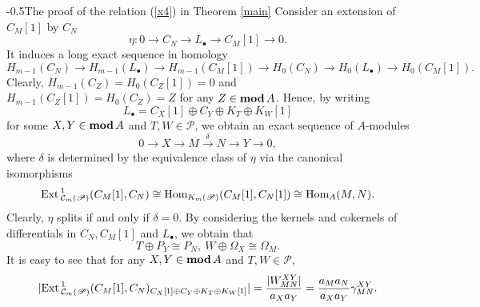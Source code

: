 \documentclass[reqno,12pt]{amsart}
\numberwithin{equation}{section}
\theoremstyle{plain}
\theoremstyle{definition}
\begin{document}
{
  {-\baselineskip}{0.5\baselineskip}{\bf\leftline}}{The proof of the relation (\ref{x4}) in Theorem \ref{main}}
Consider an extension of $C_M[1]$ by $C_N$
$$\eta: 0{\longrightarrow} C_N{\longrightarrow} L_{\bullet}{\longrightarrow} C_M[1] {\longrightarrow} 0.$$
It induces a long exact sequence in homology
$$H_{m-1}(C_N){\longrightarrow} H_{m-1}(L_{\bullet}){\longrightarrow} H_{m-1}(C_M[1]){\longrightarrow} H_0(C_N){\longrightarrow} H_0(L_{\bullet}){\longrightarrow} H_0(C_M[1]).$$ Clearly, $H_{m-1}(C_Z)=H_0(C_Z[1])=0$ and $H_{m-1}(C_Z[1])=H_0(C_Z)=Z$ for any $Z\in{\mbox{\rm \textbf{mod}}\,} A$. Hence, by writing
$$L_\bullet=C_X[1]\oplus C_Y\oplus K_T\oplus K_W[1]$$ for some $X, Y\in
{\mbox{\rm \textbf{mod}}\,} A$ and $T, W\in{{\mathscr{P}}}$,
we obtain an exact sequence of $A$-modules
\begin{equation}\label{long-exact-sequence}
0{\longrightarrow} X{\longrightarrow} M\stackrel{\delta}{\longrightarrow} N{\longrightarrow} Y{\longrightarrow} 0,
\end{equation}where $\delta$ is determined by the equivalence class of $\eta$ via the canonical isomorphisms
$${\mbox{\rm Ext}\,}^1_{\mathcal{C}_m({{\mathscr{P}}})}(C_M[1],C_N)\cong {\mbox{\rm Hom}}_{K_m({{\mathscr{P}}})}(C_M[1],C_N[1])\cong {\mbox{\rm Hom}}_A(M,N).$$ Clearly, $\eta $ splits if and only if $\delta =0$.
By considering the kernels and cokernels of differentials in $C_N, C_M[1]$ and $L_{\bullet}$, we obtain that \begin{equation}\label{TW}T\oplus P_Y\cong P_N,~W\oplus {\Omega}_X\cong {\Omega}_M.\end{equation}
It is easy to see that for any $X, Y\in
{\mbox{\rm \textbf{mod}}\,} A$ and $T, W\in{{\mathscr{P}}}$, \begin{equation}|{\mbox{\rm Ext}\,}^1_{\mathcal{C}_m({{\mathscr{P}}})}(C_M[1],C_N)_{C_X[1]\oplus C_Y\oplus K_T\oplus K_W[1]}|=\frac{|W_{MN}^{XY}|}{a_Xa_Y}=\frac{a_Ma_N}{a_Xa_Y}\gamma_{MN}^{XY}.\end{equation}
\end{document}
